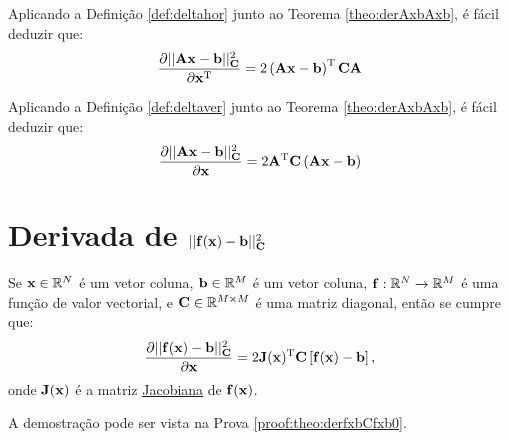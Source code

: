 \begin{corollaryT}\label{coro:derAxbAxb1}
Aplicando a Definição \ref{def:deltahor} junto ao Teorema \ref{theo:derAxbAxb}, é
fácil deduzir que:
\begin{equation}
\frac{\partial ||\MATRIX{A}\VECTOR{x}-\VECTOR{b}||_{\MATRIX{C}}^2}{\partial \VECTOR{x}^{\transpose}}=
2\left(\MATRIX{A}\VECTOR{x}- \VECTOR{b} \right)^{\transpose}\MATRIX{C}\MATRIX{A}
\end{equation}
\end{corollaryT}

\begin{corollaryT}\label{coro:derAxbAxb2}
Aplicando a Definição \ref{def:deltaver} junto ao Teorema \ref{theo:derAxbAxb}, é
fácil deduzir que:
\begin{equation}
\frac{\partial ||\MATRIX{A}\VECTOR{x}-\VECTOR{b}||_{\MATRIX{C}}^2}{\partial \VECTOR{x} }=
2 \MATRIX{A}^{\transpose}\MATRIX{C}\left(\MATRIX{A}\VECTOR{x}-\VECTOR{b}\right)
\end{equation}
\end{corollaryT}

\section{Derivada de $||\VECTOR{f}(\VECTOR{x})-\VECTOR{b}||_{\MATRIX{C}}^2$  
}

\begin{theorem}\label{theo:derfxbCfxb0}
Se 
$\VECTOR{x}\in \mathbb{R}^N$ é um vetor coluna, 
$\VECTOR{b}\in \mathbb{R}^M$ é um vetor coluna,  
$\VECTOR{f}: \mathbb{R}^{N}\rightarrow \mathbb{R}^{M}$ é uma função de valor vectorial, e
$\MATRIX{C} \in \mathbb{R}^{M\times M}$ é uma matriz diagonal, 
então se cumpre que:
\begin{equation}
\frac{\partial ||\VECTOR{f}(\VECTOR{x})-\VECTOR{b}||_{\MATRIX{C}}^2}{\partial \VECTOR{x}} =
2 \MATRIX{J}(\VECTOR{x})^{\transpose}\MATRIX{C}\left[\VECTOR{f}(\VECTOR{x})-\VECTOR{b}\right],
\end{equation}
onde $\MATRIX{J}(\VECTOR{x})$ é a matriz \hyperref[def:jacobian]{Jacobiana} \cite{Jacobian} de $\VECTOR{f}(\VECTOR{x})$.

A demostração pode ser vista na Prova \ref{proof:theo:derfxbCfxb0}.
\end{theorem}

